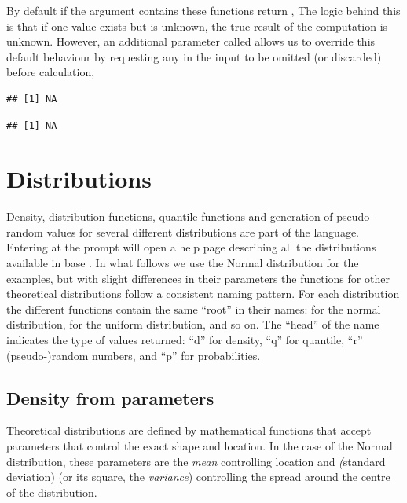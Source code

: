 \documentclass[krantz2]{krantz}\usepackage{knitr}%
\begin{document}
By default if the argument contains  these functions return , The logic behind this is that if one value exists but is unknown, the true result of the computation is unknown. However, an additional parameter called  allows us to override this default behaviour by requesting any  in the input to be omitted (or discarded) before calculation,

\begin{knitrout}\footnotesize
{}\color{fgcolor}\begin{kframe}
\begin{alltt}
 \hlkwb{<-} \hlstd{(}\hlopt{:}\hlstd{,} \hlstd{)}
\end{alltt}
\begin{verbatim}
## [1] NA
\end{verbatim}
\begin{alltt}
  \hlstd{=} \hlstd{)}
\end{alltt}
\begin{verbatim}
## [1] NA
\end{verbatim}
\end{kframe}
\end{knitrout}

\section{Distributions}
Density, distribution functions, quantile functions and generation of pseudo-random values for several different distributions are part of the \Rlang language. Entering  at the \Rlang prompt will open a help page describing all the distributions available in base \Rlang. In what follows we use the Normal distribution for the examples, but with slight differences in their parameters the functions for other theoretical distributions follow a consistent naming pattern. For each distribution the different functions contain the same ``root'' in their names:  for the normal distribution,  for the uniform distribution, and so on. The ``head'' of the name indicates the type of values returned: ``d'' for density, ``q'' for quantile, ``r'' (pseudo-)random numbers, and ``p'' for probabilities.

\subsection{Density from parameters}
Theoretical distributions are defined by mathematical functions that accept parameters that control the exact shape and location. In the case of the Normal distribution, these parameters are the \emph{mean} controlling location and \emph(standard deviation) (or its square, the \emph{variance}) controlling the spread around the centre of the distribution.
\end{document}
